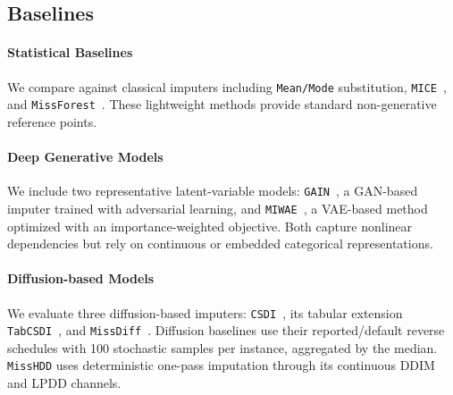 \documentclass[times, review, 10pt]{elsarticle}
\newcommand{\DIFaddbegin}{\begingroup\color{blue}}
\newcommand{\DIFaddend}{\endgroup}
\begin{document}
\subsection{Baselines}

\DIFaddbegin
\DIFaddend

\paragraph{Statistical Baselines}
We compare against classical imputers including \texttt{Mean/Mode}
substitution, \texttt{MICE}~\cite{mice}, and \texttt{MissForest}~\cite{missforest}.
\DIFaddbegin
These lightweight methods provide standard non-generative reference points.
\DIFaddend

\paragraph{Deep Generative Models}
We include two representative latent-variable models: \texttt{GAIN}~\cite{yoon2018gain},
a GAN-based imputer trained with adversarial learning, and \texttt{MIWAE}~\cite{mattei2019miwae},
a VAE-based method optimized with an importance-weighted objective.
\DIFaddbegin
Both capture nonlinear dependencies but rely on continuous or embedded
categorical representations.
\DIFaddend

\paragraph{Diffusion-based Models}
We evaluate three diffusion-based imputers: \texttt{CSDI}~\cite{csdi}, its
tabular extension \texttt{TabCSDI}~\cite{tabcsdi}, and \texttt{MissDiff}~\cite{missdiff}.
\DIFaddbegin
Diffusion baselines use their reported/default reverse schedules with 100
stochastic samples per instance, aggregated by the median. \texttt{MissHDD}
uses deterministic one-pass imputation through its continuous DDIM and LPDD
channels.
\DIFaddend



\end{document}

